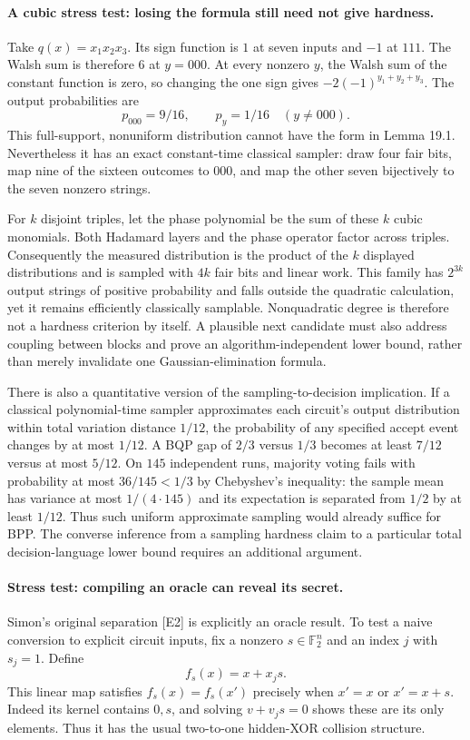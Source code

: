 \documentclass[11pt]{article}
\begin{document}
\paragraph{A cubic stress test: losing the formula still need not give hardness.}
Take $q(x)=x_1x_2x_3$. Its sign function is $1$ at seven inputs and $-1$
at $111$. The Walsh sum is therefore $6$ at $y=000$. At every nonzero
$y$, the Walsh sum of the constant function is zero, so changing the one
sign gives $-2(-1)^{y_1+y_2+y_3}$. The output probabilities are
\[
                 p_{000}=9/16,\qquad p_y=1/16\quad(y\ne000).
\]
This full-support, nonuniform distribution cannot have the form in
Lemma 19.1. Nevertheless it has an exact constant-time classical sampler:
draw four fair bits, map nine of the sixteen outcomes to $000$, and map
the other seven bijectively to the seven nonzero strings.

For $k$ disjoint triples, let the phase polynomial be the sum of these
$k$ cubic monomials. Both Hadamard layers and the phase operator factor
across triples. Consequently the measured distribution is the product of
the $k$ displayed distributions and is sampled with $4k$ fair bits and
linear work. This family has $2^{3k}$ output strings of positive probability
and falls outside the quadratic calculation, yet it remains efficiently
classically samplable. Nonquadratic degree is therefore not a hardness
criterion by itself. A plausible next candidate must also address coupling
between blocks and prove an algorithm-independent lower bound, rather than
merely invalidate one Gaussian-elimination formula.

There is also a quantitative version of the sampling-to-decision implication.
If a classical polynomial-time sampler approximates each circuit's output
distribution within total variation distance $1/12$, the probability of any
specified accept event changes by at most $1/12$. A BQP gap of $2/3$ versus
$1/3$ becomes at least $7/12$ versus at most $5/12$. On $145$ independent
runs, majority voting fails with probability at most $36/145<1/3$ by
Chebyshev's inequality: the sample mean has variance at most $1/(4\cdot145)$
and its expectation is separated from $1/2$ by at least $1/12$.
Thus such uniform approximate sampling would already suffice for BPP.
The converse inference from a sampling hardness claim to a particular total
decision-language lower bound requires an additional argument.

\paragraph{Stress test: compiling an oracle can reveal its secret.}
Simon's original separation [E2] is explicitly an oracle result. To test a
naive conversion to explicit circuit inputs, fix a nonzero
$s\in\mathbb F_2^n$ and an index $j$ with $s_j=1$. Define
\[
                         f_s(x)=x+x_j s.
\]
This linear map satisfies
$f_s(x)=f_s(x')$ precisely when $x'=x$ or $x'=x+s$. Indeed its kernel
contains $0,s$, and solving $v+v_js=0$ shows these are its only elements.
Thus it has the usual two-to-one hidden-XOR collision structure.
\end{document}
